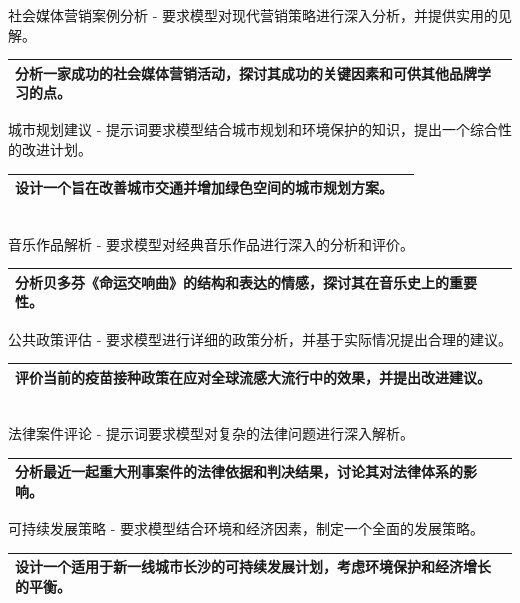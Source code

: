 \documentclass[12pt]{book}
\begin{document}
\bigskip
社会媒体营销案例分析  - 要求模型对现代营销策略进行深入分析，并提供实用的见解。

\begin{tabular}{|p{15cm}|p{3cm}|}
	\hline
分析一家成功的社会媒体营销活动，探讨其成功的关键因素和可供其他品牌学习的点。\\
	\hline
\end{tabular}


\bigskip
城市规划建议  - 提示词要求模型结合城市规划和环境保护的知识，提出一个综合性的改进计划。

\begin{tabular}{|p{15cm}|p{3cm}|}
	\hline
设计一个旨在改善城市交通并增加绿色空间的城市规划方案。\\
	\hline
\end{tabular}\\




\bigskip
音乐作品解析  - 要求模型对经典音乐作品进行深入的分析和评价。

\begin{tabular}{|p{15cm}|p{3cm}|}
	\hline
分析贝多芬《命运交响曲》的结构和表达的情感，探讨其在音乐史上的重要性。\\
	\hline
\end{tabular}


\bigskip
公共政策评估  - 要求模型进行详细的政策分析，并基于实际情况提出合理的建议。

\begin{tabular}{|p{15cm}|p{3cm}|}
	\hline
评价当前的疫苗接种政策在应对全球流感大流行中的效果，并提出改进建议。\\
	\hline
\end{tabular}\\




\bigskip
法律案件评论  - 提示词要求模型对复杂的法律问题进行深入解析。

\begin{tabular}{|p{15cm}|p{3cm}|}
	\hline
分析最近一起重大刑事案件的法律依据和判决结果，讨论其对法律体系的影响。\\
	\hline
\end{tabular}


\bigskip
可持续发展策略  - 要求模型结合环境和经济因素，制定一个全面的发展策略。

\begin{tabular}{|p{15cm}|p{3cm}|}
	\hline
	设计一个适用于新一线城市长沙的可持续发展计划，考虑环境保护和经济增长的平衡。\\
	\hline
\end{tabular}\\
\end{document}
